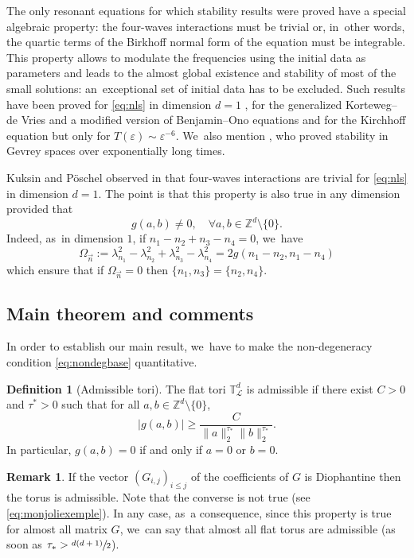 \documentclass[10pt,a4paper]{amsart}
\theoremstyle{plain}
\theoremstyle{definition}
\newtheorem{definition}[theorem]{Definition}
\newtheorem{remark}[theorem]{Remark}
\newcommand{\1}{\mathbf{1}}
\begin{document}
The only resonant equations for which stability results were proved have a special algebraic property: the four-waves interactions must be trivial or, in~other words, the quartic terms of the Birkhoff normal form of the equation must be integrable. This property allows to modulate the frequencies using the initial data as parameters and leads to the almost global existence and stability of most of the small solutions: an~exceptional set of initial data has to be excluded. Such results have been proved for \eqref{eq:nls} in dimension $d=1$ \cite{Bou00,KillBill}, for the generalized Korteweg--de Vries and a modified version of Benjamin--Ono equations \cite{KtA} and for the Kirchhoff equation \cite{BH22} but only for $T(\varepsilon)\sim \varepsilon^{-6}$. We~also mention \cite{LX23,zhiqiang}, who proved stability in Gevrey spaces over exponentially long times.

Kuksin and Pöschel observed in \cite{Kuksin-Poschel} that four-waves interactions are trivial for \eqref{eq:nls} in dimension $d=1$. The point is that this property is also true in any dimension provided that
\begin{equation}
\label{eq:nondegbase}
g(a,b) \neq 0, \quad \forall a,b \in \mathbb{Z}^d \setminus \{0\}.
\end{equation}
Indeed, as~in dimension $1$, if $n_1-n_2+n_3-n_4 = 0$, we~have
\[
\Omega_{\vec{n}}:= \lambda_{n_1}^2 - \lambda_{n_2}^2 + \lambda_{n_3}^2 - \lambda_{n_4}^2 = 2 g(n_1-n_2,n_1-n_4)
\]
which ensure that if $ \Omega_{\vec{n}}=0$ then $\{n_1,n_3\} = \{n_2,n_4\}$.

\subsection{Main theorem and comments}

In order to establish our main result, we~have to make the non-degeneracy condition \eqref{eq:nondegbase} quantitative.
\begin{definition}[Admissible tori]\label{def:tori} The flat tori $\mathbb{T}^d_{\mathscr{L}}$ is admissible if there exist $C>0$ and $\tau^{\ast}>0$ such that for all $a,b \in \mathbb{Z}^{d} \setminus \{0\}$,
\begin{equation}
\label{eq:adm}
|g(a,b)| \geq \frac{C}{\|a\|_{2}^{\tau_{\ast}}\|b\|_{2}^{\tau_{\ast}}}.
\end{equation}
In particular, $g(a,b)=0$ if and only if $a=0$ or $b=0$.
\end{definition}

\begin{remark}
If the vector $(G_{i,j})_{i\leq j}$ of the coefficients of $G$ is Diophantine then the torus is admissible. Note that the converse is not true (see \eqref{eq:monjoliexemple}). In any case, as~a consequence, since this property is true for almost all matrix $G$, we~can say that almost all flat torus are admissible (as soon as $\tau_\ast > \sfrac{d(d+1)}{2}$).
\end{remark}
\end{document}
